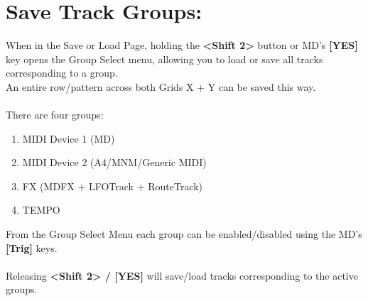 \section{Save Track Groups:}
When in the Save or Load Page, holding the \textbf{<Shift 2>} button or MD's \textbf{[YES]} key opens the Group Select menu,
allowing you to load or save all tracks corresponding to a group.\\An entire row/pattern across both Grids X + Y can be saved this way.\\
\\
There are four groups:
\begin{enumerate}
    \item MIDI Device 1 (MD)
    \item MIDI Device 2 (A4/MNM/Generic MIDI)
    \item FX (MDFX + LFOTrack + RouteTrack)
    \item TEMPO
\end{enumerate}
From the Group Select Menu each group can be enabled/disabled using the MD's \textbf{[Trig]} keys.\\
\\
Releasing \textbf{<Shift 2> / [YES]} will save/load tracks corresponding to the active groups.



